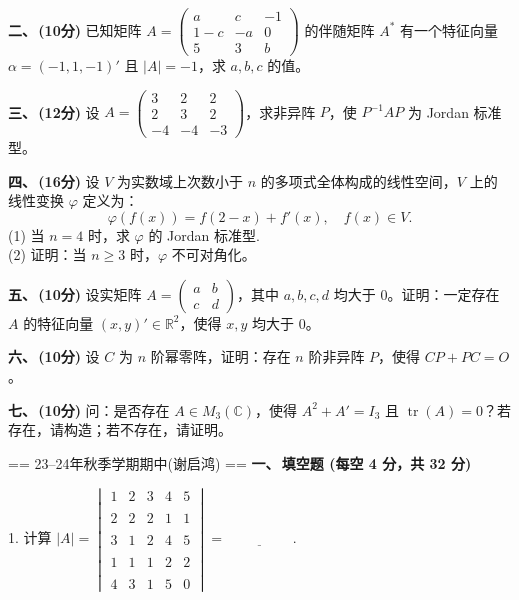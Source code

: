 \textbf{二、\,(10分)} 已知矩阵 $A = \begin{pmatrix}
    a & c & -1 \\
    1-c & -a & 0 \\
    5 & 3 & b
\end{pmatrix}$ 的伴随矩阵 $A^*$ 有一个特征向量 $\alpha = (-1, 1, -1)'$ 且 $|A| = -1$，求 $a, b, c$ 的值。

\textbf{三、\,(12分)} 设 $A = \begin{pmatrix}
    3 & 2 & 2 \\
    2 & 3 & 2 \\
    -4 & -4 & -3
\end{pmatrix}$，求非异阵 $P$，使 $P^{-1}AP$ 为 Jordan 标准型。


\textbf{四、\,(16分)} 设 $V$ 为实数域上次数小于 $n$ 的多项式全体构成的线性空间，$V$ 上的
线性变换 $\varphi$ 定义为：
\[
\varphi(f(x)) = f(2-x) + f'(x), \quad f(x) \in V.
\]
(1) 当 $n=4$ 时，求 $\varphi$ 的 Jordan 标准型.\\
(2) 证明：当 $n \ge 3$ 时，$\varphi$ 不可对角化。

\textbf{五、\,(10分)} 设实矩阵 $A = \begin{pmatrix} a & b \\ c & d \end{pmatrix}$，其中 $a, b, c, d$ 均大于 $0$。证明：一定存在 $A$ 的特征向量 $(x, y)' \in \mathbb{R}^2$，使得 $x, y$ 均大于 $0$。

\textbf{六、\,(10分)} 设 $C$ 为 $n$ 阶幂零阵，证明：存在 $n$ 阶非异阵 $P$，使得 $CP + PC = O$。

\textbf{七、\,(10分)} 问：是否存在 $A \in M_3(\mathbb{C})$，使得 $A^2 + A' = I_3$ 且 $\operatorname{tr}(A) = 0$？若存在，请构造；若不存在，请证明。


== 23--24年秋季学期期中(谢启鸿) ==
\textbf{一、\,填空题 (每空 4 分，共 32 分)}

1. 计算 $|A| = \begin{vmatrix} 
1 & 2 & 3 & 4 & 5 \\ \\
2 & 2 & 2 & 1 & 1 \\ \\
3 & 1 & 2 & 4 & 5 \\ \\
1 & 1 & 1 & 2 & 2 \\ \\
4 & 3 & 1 & 5 & 0 
\end{vmatrix} = \underline{\hspace{2cm}}$.

